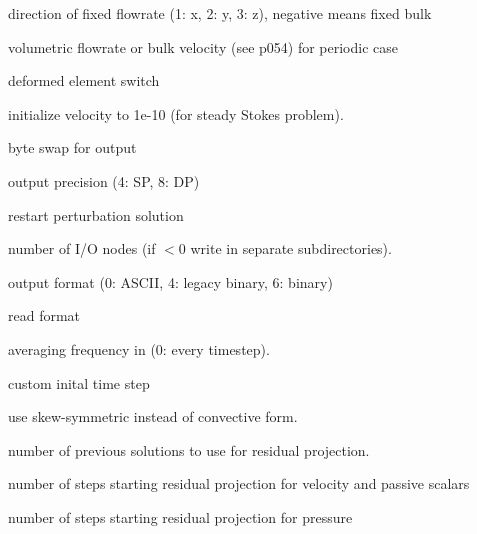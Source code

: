 \documentclass[letterpaper,10pt,english]{sphinxmanual}
\begin{document}
\begin{DUlineblock}{0em}
\item[]  direction of fixed flowrate (1: x, 2: y, 3: z), negative means fixed bulk
\item[] 
\item[]  volumetric flowrate or bulk velocity (see p054) for periodic case
\item[] 
\item[]  deformed element switch
\item[] 
\item[]  initialize velocity to 1e-10 (for steady Stokes problem).
\item[] 
\item[]  byte swap for output
\item[] 
\item[]  output precision (4: SP, 8: DP)
\item[] 
\item[]  restart perturbation solution
\item[] 
\item[]  number of I/O nodes (if \(< 0\) write in separate subdirectories).
\item[] 
\item[]  output format (0: ASCII, 4: legacy binary, 6: binary)
\item[] 
\item[]  read format
\item[] 
\item[]  averaging frequency in  (0: every timestep).
\item[] 
\item[]  custom inital time step
\item[] 
\item[]  use skew-symmetric instead of convective form.
\item[] 
\item[]  number of previous solutions to use for residual projection.
\item[] 
\item[]  number of steps starting residual projection for velocity and passive scalars
\item[] 
\item[]  number of steps starting residual projection for pressure

\end{DUlineblock}
\end{document}
